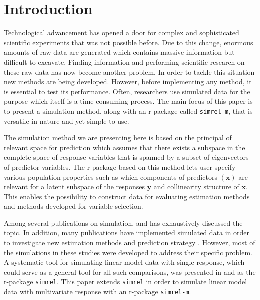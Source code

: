 \documentclass[12pt,A4paper,authoryear]{elsarticle} %
\theoremstyle{definition}
\theoremstyle{definition}
\theoremstyle{remark}
\begin{document}
\section{Introduction}\label{introduction}

Technological advancement has opened a door for complex and
sophisticated scientific experiments that was not possible before. Due
to this change, enormous amounts of raw data are generated which
contains massive information but difficult to excavate. Finding
information and performing scientific research on these raw data has now
become another problem. In order to tackle this situation new methods
are being developed. However, before implementing any method, it is
essential to test its performance. Often, researchers use simulated data
for the purpose which itself is a time-consuming process. The main focus
of this paper is to present a simulation method, along with an r-package
called \texttt{simrel-m}, that is versatile in nature and yet simple to
use.

The simulation method we are presenting here is based on the principal
of relevant space for prediction \citep{helland1994comparison} which
assumes that there exists a subspace in the complete space of response
variables that is spanned by a subset of eigenvectors of predictor
variables. The r-package based on this method lets user specify various
population properties such as which components of predictors
\((\mathbf{x})\) are relevant for a latent subspace of the responses
\(\mathbf{y}\) and collinearity structure of \(\mathbf{x}\). This
enables the possibility to construct data for evaluating estimation
methods and methods developed for variable selection.

Among several publications on simulation, \citet{ripley2009stochastic}
and \citet{gamerman2006markov} has exhaustively discussed the topic. In
addition, many publications have implemented simulated data in order to
investigate new estimation methods and prediction strategy
\citep[see:][]{cook2015simultaneous, cook2013envelopes, helland2012near}.
However, most of the simulations in these studies were developed to
address their specific problem. A systematic tool for simulating linear
model data with single response, which could serve as a general tool for
all such comparisons, was presented in \citet{saebo2015simrel} and as
the r-package \texttt{simrel}. This paper extends \texttt{simrel} in
order to simulate linear model data with multivariate response with an
r-package \texttt{simrel-m}.
\end{document}
